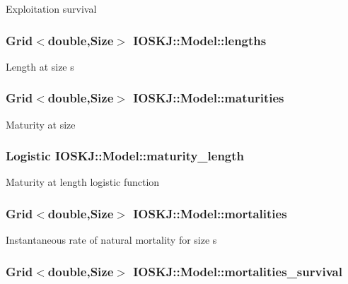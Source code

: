 Exploitation survival \hypertarget{classIOSKJ_1_1Model_a9ed62e62883359a97f6233f967988752}{
\subsubsection[{lengths}]{\setlength{\rightskip}{0pt plus 5cm}Grid$<$double,Size$>$ I\-O\-S\-K\-J\-::\-Model\-::lengths}}\label{classIOSKJ_1_1Model_a9ed62e62883359a97f6233f967988752}
Length at size s \hypertarget{classIOSKJ_1_1Model_a9a08346e45795f894a4834eb17287e24}{
\subsubsection[{maturities}]{\setlength{\rightskip}{0pt plus 5cm}Grid$<$double,Size$>$ I\-O\-S\-K\-J\-::\-Model\-::maturities}}\label{classIOSKJ_1_1Model_a9a08346e45795f894a4834eb17287e24}
Maturity at size \hypertarget{classIOSKJ_1_1Model_aa4dc63b9c8a2263357c7d14af65b8fe6}{
\subsubsection[{maturity\-\_\-length}]{\setlength{\rightskip}{0pt plus 5cm}Logistic I\-O\-S\-K\-J\-::\-Model\-::maturity\-\_\-length}}\label{classIOSKJ_1_1Model_aa4dc63b9c8a2263357c7d14af65b8fe6}
Maturity at length logistic function \hypertarget{classIOSKJ_1_1Model_a44abf17936152f00fa877c4e8ae343dc}{
\subsubsection[{mortalities}]{\setlength{\rightskip}{0pt plus 5cm}Grid$<$double,Size$>$ I\-O\-S\-K\-J\-::\-Model\-::mortalities}}\label{classIOSKJ_1_1Model_a44abf17936152f00fa877c4e8ae343dc}
Instantaneous rate of natural mortality for size s \hypertarget{classIOSKJ_1_1Model_a3068a8a351456ec886b3176586822d40}{
\subsubsection[{mortalities\-\_\-survival}]{\setlength{\rightskip}{0pt plus 5cm}Grid$<$double,Size$>$ I\-O\-S\-K\-J\-::\-Model\-::mortalities\-\_\-survival}}\label{classIOSKJ_1_1Model_a3068a8a351456ec886b3176586822d40}
